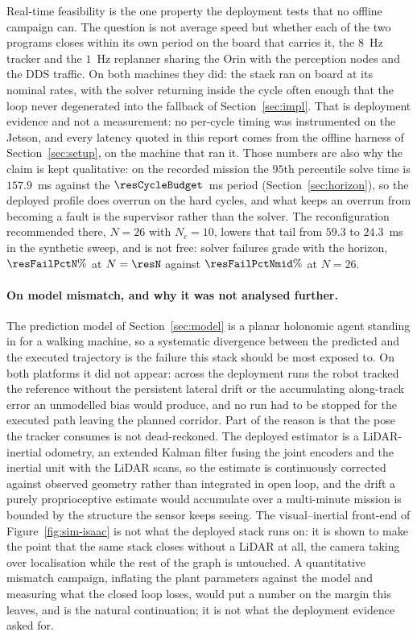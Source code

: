 \documentclass[11pt,a4paper]{article}
\newcommand{\Ninput}{N_c}
\begin{document}
Real-time feasibility is the one property the deployment tests that no offline campaign can. The question is
not average speed but whether each of the two programs closes within its own period on the board that
carries it, the $8$~Hz tracker and the $1$~Hz replanner sharing the Orin with the perception nodes and the
DDS traffic. On both machines they did: the stack ran on board at its nominal rates, with the solver
returning inside the cycle often enough that the loop never degenerated into the fallback of
Section~\ref{sec:impl}. That is deployment evidence and not a measurement: no per-cycle timing was
instrumented on the Jetson, and every latency quoted in this report comes from the offline harness of
Section~\ref{sec:setup}, on the machine that ran it. Those numbers are also why the claim is kept
qualitative: on the recorded mission the $95$th percentile solve time is $157.9$~ms against the
$\resCycleBudget$~ms period (Section~\ref{sec:horizon}), so the deployed profile does overrun on the hard
cycles, and what keeps an overrun from becoming a fault is the supervisor rather than the solver. The
reconfiguration recommended there, $N=26$ with $\Ninput=10$, lowers that tail from $59.3$ to $24.3$~ms in
the synthetic sweep, and is not free: solver failures grade with the horizon, $\resFailPctN\%$ at
$N=\resN$ against $\resFailPctNmid\%$ at $N=26$.

\paragraph{On model mismatch, and why it was not analysed further.} The prediction model of
Section~\ref{sec:model} is a planar holonomic agent standing in for a walking machine, so a systematic
divergence between the predicted and the executed trajectory is the failure this stack should be most
exposed to. On both platforms it did not appear: across the deployment runs the robot tracked the reference
without the persistent lateral drift or the accumulating along-track error an unmodelled bias would
produce, and no run had to be stopped for the executed path leaving the planned corridor. Part of the
reason is that the pose the tracker consumes is not dead-reckoned. The deployed estimator is a
LiDAR-inertial odometry, an extended Kalman filter fusing the joint encoders and the inertial unit with the
LiDAR scans, so the estimate is continuously corrected against observed geometry rather than integrated in
open loop, and the drift a purely proprioceptive estimate would accumulate over a multi-minute mission is
bounded by the structure the sensor keeps seeing. The visual--inertial front-end of
Figure~\ref{fig:sim-isaac} is not what the deployed stack runs on: it is shown to make the point that the
same stack closes without a LiDAR at all, the camera taking over localisation while the rest of the graph
is untouched. A quantitative mismatch campaign, inflating the plant parameters against the model and
measuring what the closed loop loses, would put a number on the margin this leaves, and is the natural
continuation; it is not what the deployment evidence asked for.
\end{document}
